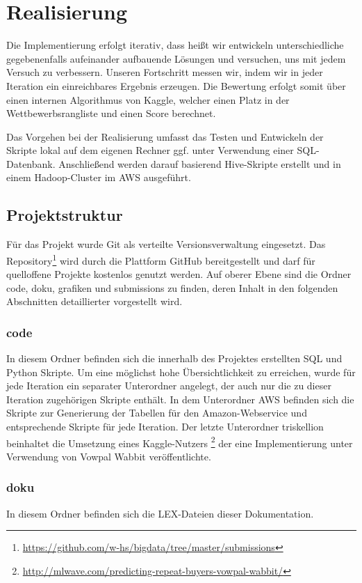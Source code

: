 \section{Realisierung}

Die Implementierung erfolgt iterativ, dass heißt wir entwickeln unterschiedliche gegebenenfalls aufeinander aufbauende Lösungen
und versuchen, uns mit jedem Versuch zu verbessern. Unseren Fortschritt messen wir, indem wir in jeder Iteration ein einreichbares Ergebnis erzeugen. Die Bewertung erfolgt somit über einen internen Algorithmus von Kaggle, welcher einen Platz in der Wettbewerbsrangliste und einen Score berechnet.

Das Vorgehen bei der Realisierung umfasst das Testen und Entwickeln der Skripte lokal auf 
dem eigenen Rechner ggf. unter Verwendung einer SQL-Datenbank. 
Anschließend werden darauf basierend Hive-Skripte erstellt und in einem Hadoop-Cluster
im AWS ausgeführt.

\subsection{Projektstruktur}
Für das Projekt wurde Git als verteilte Versionsverwaltung eingesetzt. Das Repository\footnote{\url{https://github.com/w-hs/bigdata/tree/master/submissions}} wird durch die Plattform GitHub bereitgestellt und darf für quelloffene Projekte kostenlos genutzt werden. Auf oberer Ebene sind die Ordner code, doku, grafiken und submissions zu finden, deren Inhalt in den folgenden Abschnitten detaillierter vorgestellt wird.

\subsubsection{code}
In diesem Ordner befinden sich die innerhalb des Projektes erstellten SQL und Python Skripte. Um eine möglichst hohe Übersichtlichkeit zu erreichen, wurde für jede Iteration ein separater Unterordner angelegt, der auch nur die zu dieser Iteration zugehörigen Skripte enthält. In dem Unterordner AWS befinden sich die Skripte zur Generierung der Tabellen für den Amazon-Webservice und entsprechende Skripte für jede Iteration. Der letzte Unterordner triskellion beinhaltet die Umsetzung eines Kaggle-Nutzers \footnote{\url{http://mlwave.com/predicting-repeat-buyers-vowpal-wabbit/}} der eine Implementierung unter Verwendung von Vowpal Wabbit veröffentlichte.

\subsubsection{doku}
In diesem Ordner befinden sich die LEX-Dateien dieser Dokumentation.

